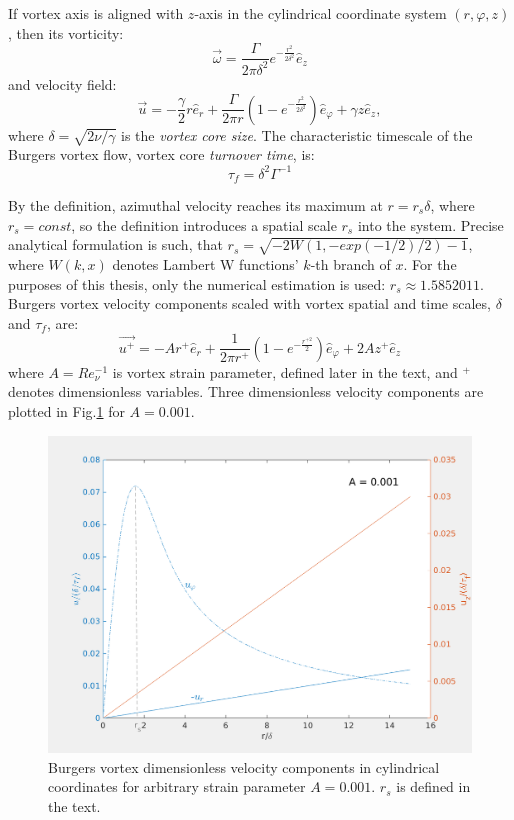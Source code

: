 \documentclass[../main.tex]{subfiles}
\begin{document}
If vortex axis is aligned with $z$-axis in the cylindrical coordinate system $(r, \varphi, z)$, then its vorticity:
\begin{equation}
\vec{\omega}=\frac{\Gamma}{2 \pi \delta^2} e^{-\frac{r^2}{2 \delta^2}} \hat{e}_z
\label{def:omega_Bur}
\end{equation}
and velocity field:
\begin{equation}
\vec{u}=-\frac{\gamma}{2} r \hat{e}_r+\frac{\Gamma}{2 \pi r} \left(1-e^{-\frac{r^2}{2\delta^2}}\right)\hat{e}_{\varphi}+\gamma z \hat{e}_z,
\label{def_Bur}
\end{equation}
where $\delta=\sqrt{2 \nu / \gamma}$ is the \emph{vortex core size}. The characteristic timescale of the Burgers vortex flow, vortex core \emph{turnover time}, is:
\begin{equation}
\tau_f=\delta^2 \Gamma^{-1}
\label{def:tau_f}
\end{equation}

By the definition, azimuthal velocity reaches its maximum at $r=r_s \delta$, where $r_s=const$, so the definition introduces a spatial scale $r_s$ into the system. Precise analytical formulation is such, that $r_s=\sqrt{-2 W(1,-exp(-1/2)/2)-1}$, where $W(k,x)$ denotes Lambert W functions' $k$-th branch of $x$. For the purposes of this thesis, only the numerical estimation is used: $r_s \approx 1.5852011$. Burgers vortex velocity components scaled with vortex spatial and time scales, $\delta$ and $\tau_f$, are:
\begin{equation}
\vec{u^+}=- A r^+ \hat{e}_r+\frac{1}{2 \pi r^+} \left(1-e^{-\frac{r^{+ 2}}{2}}\right)\hat{e}_{\varphi}+ 2 A z^+ \hat{e}_z
\label{def:Bur_nodim}
\end{equation}
where $A=Re_{\nu}^{-1}$ is vortex strain parameter, defined later in the text, and $^+$ denotes dimensionless variables. Three dimensionless velocity components are plotted in Fig.\ref{fig:ch2_01b} for $A=0.001$.
\begin{figure}
\centering
\noindent \includegraphics[width=30pc]{gfx/Burg_vor_vel_comp.png}
\caption{Burgers vortex dimensionless velocity components in cylindrical coordinates for arbitrary strain parameter $A=0.001$. $r_s$ is defined in the text.}
\label{fig:ch2_01b}
\end{figure}
\end{document}
